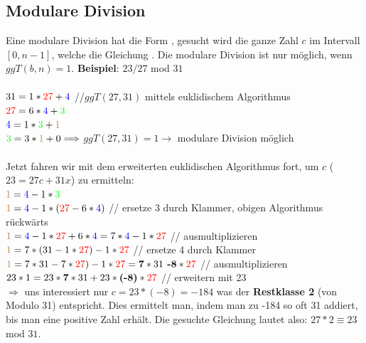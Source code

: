 \documentclass[10pt]{article}
\begin{document}
\subsection{Modulare Division}
Eine modulare Division hat die Form  , gesucht wird die ganze Zahl $c$ im Intervall $[0,n-1]$, welche die Gleichung . Die modulare Division ist nur möglich, wenn $ggT(b,n)=1$. \textbf{Beispiel}: $23/27$ mod $31$
\\\\
$31 = 1 * {\color{red}27} + {\color{blue}4}$ \hspace{2cm} {\color{gray}//$ggT(27,31)$ mittels euklidischem Algorithmus} \\
${\color{red}27} = 6 * {\color{blue}4} + {\color{green}3}$ \\
${\color{blue}4} = 1 * {\color{green}3} + {\color{brown}1}$\\
${\color{green}3} = 3 * {\color{brown}1} + 0 \Longrightarrow$ $ggT(27,31) = 1 \rightarrow$  modulare Division möglich \\
\\
Jetzt fahren wir mit dem erweiterten euklidischen Algorithmus fort, um $c$ ($23 = 27c + 31x$) zu ermitteln:\\
${\color{brown}1} = {\color{blue}4} - 1 * {\color{green}3}$\\
${\color{brown}1} = {\color{blue}4} - 1 * ({\color{red}27} - 6 * {\color{blue}4})$  {\color{gray}// ersetze $3$ durch Klammer, obigen Algorithmus rückwärts}\\
${\color{brown}1} = {\color{blue}4} - 1 * {\color{red}27} + 6 * {\color{blue}4} = 7 * {\color{blue}4} - 1 * {\color{red}27}$  {\color{gray}// ausmultiplizieren}\\
${\color{brown}1} = 7 * (31 - 1 * {\color{red}27}) - 1 * {\color{red}27}$  {\color{gray}// ersetze {\color{blue}4} durch Klammer}\\
${\color{brown}1} = 7 * 31 - 7 * {\color{red}27}) - 1 * {\color{red}27} = \textbf{7} * 31 \textbf{ -8} * {\color{red}27}$  {\color{gray}// ausmultiplizieren}\\
$23 * 1 = 23 * \textbf{7} * 31 + 23 * \textbf{(-8)} * {\color{red}27}$  {\color{gray}// erweitern mit 23}\\
$\Longrightarrow$ uns interessiert nur $c = 23 * (-8) = -184$ was der \textbf{Restklasse 2} (von Modulo 31) entspricht. Dies ermittelt man, indem man zu -184 so oft 31 addiert, bis man eine positive Zahl erhält. Die gesuchte Gleichung lautet also: $27 * 2 \equiv 23$ mod $31$.
\end{document}
